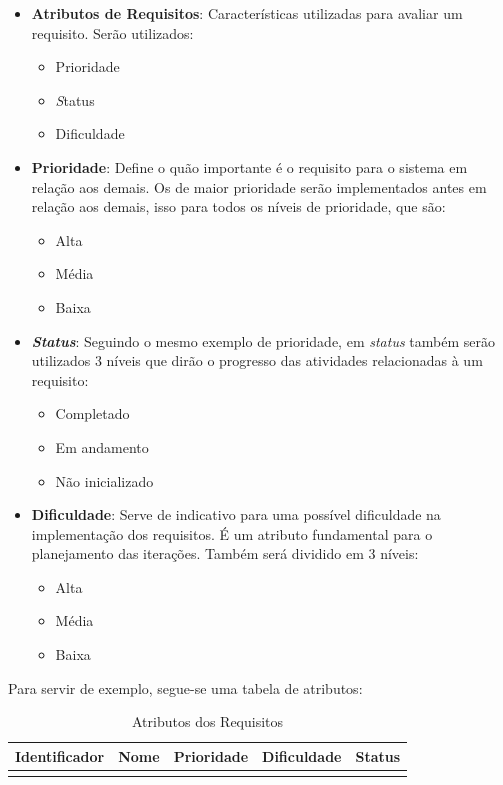 \begin{itemize}
\item \textbf{Atributos de Requisitos}: Características utilizadas para avaliar um requisito. Serão utilizados:

\begin{itemize}
\item Prioridade
\item \textit Status
\item Dificuldade
\end{itemize}

\item \textbf{Prioridade}: Define o quão importante é o requisito para o sistema em relação aos demais. Os de maior prioridade serão implementados antes em relação aos demais, isso para todos os níveis de prioridade, que são:

\begin{itemize}
\item Alta
\item Média
\item Baixa
\end{itemize}

\item \textbf{\textit{Status}}: Seguindo o mesmo exemplo de prioridade, em \textit{status} também serão utilizados 3 níveis que dirão o progresso das atividades relacionadas à um requisito:

\begin{itemize}
\item Completado
\item Em andamento
\item Não inicializado
\end{itemize}

\item \textbf{Dificuldade}: Serve de indicativo para uma possível dificuldade na implementação dos requisitos. É um atributo fundamental para o planejamento das iterações. Também será dividido em 3 níveis:

\begin{itemize}
\item Alta
\item Média
\item Baixa
\end{itemize}
\end{itemize}

Para servir de exemplo, segue-se uma tabela de atributos:

\begin{table}[h]
\centering
\label{requirements-qualities}
\begin{tabular}{|l|l|l|l|l|}
\hline
\textbf{Identificador} & \textbf{Nome} & \textbf{Prioridade} & \textbf{Dificuldade} & \textbf{Status} \\ \hline
                       &               &                     &                      &                 \\ \hline
\end{tabular}
\caption{Atributos dos Requisitos}
\end{table}

